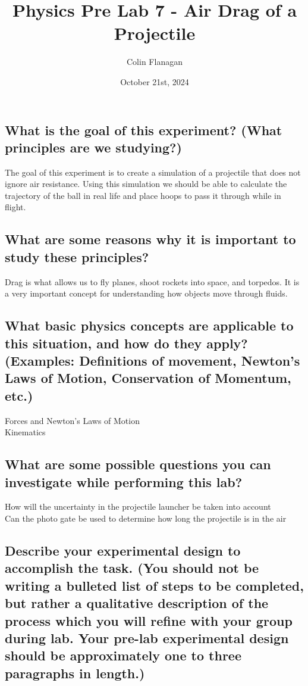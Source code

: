 \documentclass{article}
\title{Physics Pre Lab 7 - Air Drag of a Projectile}
\author{Colin Flanagan}
\date{October 21st, 2024}
\begin{document}
\maketitle

\subsection*{What is the goal of this experiment? (What principles are we studying?)}

    The goal of this experiment is to create a simulation of a projectile that does not ignore air resistance. Using this simulation we should be able to calculate the trajectory of the ball in real life and place hoops to pass it through while in flight.
    

\subsection*{What are some reasons why it is important to study these principles?
}

    Drag is what allows us to fly planes, shoot rockets into space, and torpedos. It is a very important concept for understanding how objects move through fluids.  
    
\subsection*{What basic physics concepts are applicable to this situation, and how do they apply? (Examples: Definitions of movement, Newton’s Laws of Motion, Conservation of Momentum, etc.)}

    Forces and Newton's Laws of Motion\\
    Kinematics

\subsection*{What are some possible questions you can investigate while performing this lab?
}

   How will the uncertainty in the projectile launcher be taken into account \\ 
   
   Can the photo gate be used to determine how long the projectile is in the air\\

\subsection*{Describe your experimental design to accomplish the task. (You should not be writing a bulleted list of steps to be completed, but rather a qualitative description of the process which you will refine with your group during lab. Your pre-lab experimental design should be approximately one to three paragraphs in length.)}
\end{document}

